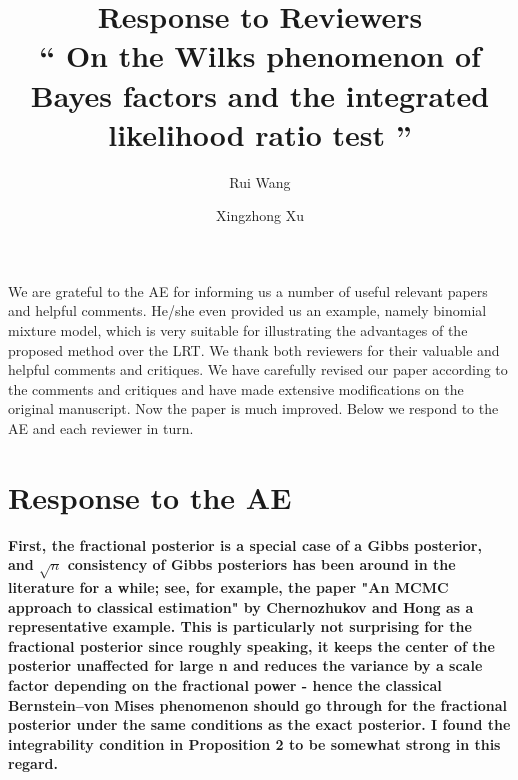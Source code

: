 \documentclass[11pt]{article}
\title{Response to Reviewers\\
    ``
    On the Wilks phenomenon of Bayes factors and the integrated likelihood ratio test
    ''
}
\author[1]{Rui Wang}
\author[1,2]{Xingzhong Xu}
\affil[1]{
School of Mathematics and Statistics, Beijing Institute of Technology, Beijing 
    100081,China
}
\affil[2]{
Beijing Key Laboratory on MCAACI, Beijing Institute of Technology, Beijing 100081,China
}
\theoremstyle{plain}
\theoremstyle{definition}
\theoremstyle{remark}
\begin{document}
\maketitle
We are grateful to the AE for informing us a number of useful relevant papers and helpful comments.
He/she even provided us an example, namely binomial mixture model, which is very suitable for illustrating the advantages of the proposed method over the LRT.
We thank both reviewers for their valuable and helpful comments and critiques.
We have carefully revised our paper according to the comments and critiques and have made extensive modifications on the original manuscript.
Now the paper is much improved.
Below we respond to the AE and each reviewer in turn.

\section{Response to the AE}
\textbf{
    First, the fractional posterior is a special case of a Gibbs posterior, and $\sqrt{n}$ consistency of Gibbs posteriors has been around in the literature for a while; see, for example, the paper "An MCMC approach to classical estimation" by Chernozhukov and Hong as a representative example. This is particularly not surprising for the fractional posterior since roughly speaking, it keeps the center of the posterior unaffected for large n and reduces the variance by a scale
    factor depending on the fractional power - hence the classical Bernstein--von Mises phenomenon should go through for the fractional posterior under the same conditions as the exact posterior. I found the integrability condition in Proposition 2 to be somewhat strong in this regard.
}
\end{document}
